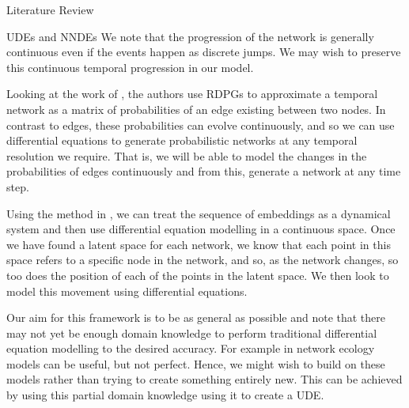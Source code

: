 \documentclass[12pt]{amsbook}
\begin{document}
\begin{chapter}{Literature Review}
\begin{section}{UDEs and NNDEs}
        We note that the progression of the network is generally continuous even if the events happen as discrete jumps. We may wish to preserve this continuous temporal progression in our model.
        

        
        Looking at the work of \cite{sanna2021link}, the authors use RDPGs to approximate a temporal network as a matrix of probabilities of an edge existing between two nodes. In contrast to edges, these probabilities can evolve continuously, and so we can use differential equations to generate probabilistic networks at any temporal resolution we require. That is, we will be able to model the changes in the probabilities of edges continuously and from this, generate a network at any time step.

        Using the method in \cite{sanna2021link}, we can treat the sequence of embeddings as a dynamical system and then use differential equation modelling in a continuous space. Once we have found a latent space for each network, we know that each point in this space refers to a specific node in the network, and so, as the network changes, so too does the position of each of the points in the latent space. We then look to model this movement using differential equations. 
        
        Our aim for this framework is to be as general as possible and note that there may not yet be enough domain knowledge to perform traditional differential equation modelling to the desired accuracy. For example in network ecology models can be useful, but not perfect. Hence, we might wish to build on these models rather than trying to create something entirely new. This can be achieved by using this partial domain knowledge using it to create a UDE\cite{SciML_C_Rak}.


\end{section}
\end{chapter}
\end{document}
